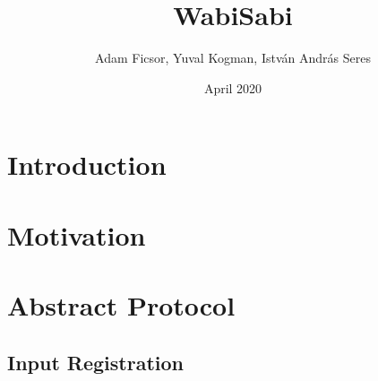 \documentclass{article}
\title{WabiSabi}
\author{Adam Ficsor, Yuval Kogman, István András Seres}
\date{April 2020}
\begin{document}
\maketitle

\section{Introduction}


\section{Motivation}


\section{Abstract Protocol}




\subsection{Input Registration}

\end{document}
